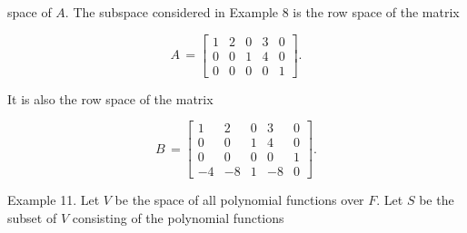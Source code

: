 space of \(A\). The subspace considered in Example 8 is the row space of the matrix

\[A\,=\!\left[\!\!\begin{array}{cccccc}1&2&0&3&0\\ 0&0&1&4&0\\ 0&0&0&0&1\end{array}\!\!\!\right]\!.\]

It is also the row space of the matrix

\[B\,=\!\left[\!\!\begin{array}{cccccc}1&2&0&3&0\\ 0&0&1&4&0\\ 0&0&0&0&1\\ -4&-8&1&-8&0\end{array}\!\!\!\right]\!.\]

Example 11. Let \(V\) be the space of all polynomial functions over \(F\). Let \(S\) be the subset of \(V\) consisting of the polynomial functions 